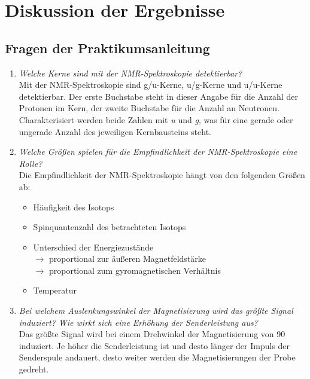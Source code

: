 \section{Diskussion der Ergebnisse}
\label{sec:diskussion}

\subsection{Fragen der Praktikumsanleitung}
\begin{enumerate}
	\item \textit{Welche Kerne sind mit der NMR-Spektroskopie detektierbar?}\vspace*{1mm}\\
	Mit der NMR-Spektroskopie sind g/u-Kerne, u/g-Kerne und u/u-Kerne detektierbar. Der erste Buchstabe steht in dieser Angabe für die Anzahl der Protonen im Kern, der zweite Buchstabe für die Anzahl an Neutronen. Charakterisiert werden beide Zahlen mit \textit{u} und \textit{g}, was für eine gerade oder ungerade Anzahl des jeweiligen Kernbausteins steht. 
	\item \textit{Welche Größen spielen für die Empfindlichkeit der NMR-Spektroskopie eine Rolle?}\vspace*{1mm}\\
	Die Empfindlichkeit der NMR-Spektroskopie hängt von den folgenden Größen ab:
	\begin{itemize}
		\item Häufigkeit des Isotops
		\item Spinquantenzahl des betrachteten Isotops
		\item Unterschied der Energiezustände\\
		$\rightarrow$ proportional zur äußeren Magnetfeldstärke\\
		$\rightarrow$ proportional zum gyromagnetischen Verhältnis
		\item Temperatur
	\end{itemize}
	
	\item \textit{Bei welchem Auslenkungswinkel der Magnetisierung wird das größte Signal induziert? Wie wirkt sich eine Erhöhung der Senderleistung aus?}\vspace{1mm}\\
	Das größte Signal wird bei einem Drehwinkel der Magnetisierung von \SI{90}{\degrees} induziert. Je höher die Senderleistung ist und desto länger der Impuls der Senderspule andauert, desto weiter werden die Magnetisierungen der Probe gedreht.
	

\end{enumerate}
